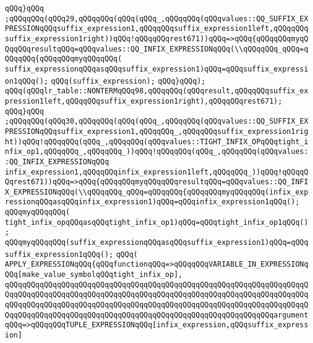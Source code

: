 \verb|qQQq}qQQq|\newline
\verb|;qQQqqQQq(qQQq29,qQQqqQQq(qQQq(qQQq_,qQQqqQQq(qQQqvalues::QQ_SUFFIX_EXPRESSIONqQQqsuffix_expression1,qQQqqQQqsuffix_expression1left,qQQqqQQqsuffix_expression1right))qQQq!qQQqqQQqrest671))qQQq=>qQQq{qQQqqQQqmyqQQqqQQqresultqQQq=qQQqvalues::QQ_INFIX_EXPRESSIONqQQq(\\qQQqqQQq_qQQq=qQQqqQQq{qQQqqQQqmyqQQqqQQq(|\newline
\verb|suffix_expressionqQQqasqQQqsuffix_expression1)qQQq=qQQqsuffix_expression1qQQq();|\newline
\verb|qQQq(suffix_expression);|\newline
\verb|qQQq}qQQq);|\newline
\verb|qQQq(qQQqlr_table::NONTERMqQQq98,qQQqqQQq(qQQqresult,qQQqqQQqsuffix_expression1left,qQQqqQQqsuffix_expression1right),qQQqqQQqrest671);|\newline
\verb|qQQq}qQQq|\newline
\verb|;qQQqqQQq(qQQq30,qQQqqQQq(qQQq(qQQq_,qQQqqQQq(qQQqvalues::QQ_SUFFIX_EXPRESSIONqQQqsuffix_expression1,qQQqqQQq_,qQQqqQQqsuffix_expression1right))qQQq!qQQqqQQq(qQQq_,qQQqqQQq(qQQqvalues::TIGHT_INFIX_OPqQQqtight_infix_op1,qQQqqQQq_,qQQqqQQq_))qQQq!qQQqqQQq(qQQq_,qQQqqQQq(qQQqvalues::QQ_INFIX_EXPRESSIONqQQq|\newline
\verb|infix_expression1,qQQqqQQqinfix_expression1left,qQQqqQQq_))qQQq!qQQqqQQqrest671))qQQq=>qQQq{qQQqqQQqmyqQQqqQQqresultqQQq=qQQqvalues::QQ_INFIX_EXPRESSIONqQQq(\\qQQqqQQq_qQQq=qQQqqQQq{qQQqqQQqmyqQQqqQQq(infix_expressionqQQqasqQQqinfix_expression1)qQQq=qQQqinfix_expression1qQQq();|\newline
\verb|qQQqmyqQQqqQQq(|\newline
\verb|tight_infix_opqQQqasqQQqtight_infix_op1)qQQq=qQQqtight_infix_op1qQQq();|\newline
\verb|qQQqmyqQQqqQQq(suffix_expressionqQQqasqQQqsuffix_expression1)qQQq=qQQqsuffix_expression1qQQq();|\newline
\verb|qQQq(|\newline
\verb|APPLY_EXPRESSIONqQQq{qQQqfunctionqQQq=>qQQqqQQqVARIABLE_IN_EXPRESSIONqQQq[make_value_symbolqQQqtight_infix_op],|\newline
\verb|qQQqqQQqqQQqqQQqqQQqqQQqqQQqqQQqqQQqqQQqqQQqqQQqqQQqqQQqqQQqqQQqqQQqqQQqqQQqqQQqqQQqqQQqqQQqqQQqqQQqqQQqqQQqqQQqqQQqqQQqqQQqqQQqqQQqqQQqqQQqqQQqqQQqqQQqqQQqqQQqqQQqqQQqqQQqqQQqqQQqqQQqqQQqqQQqqQQqqQQqqQQqqQQqqQQqqQQqqQQqqQQqqQQqqQQqqQQqqQQqqQQqqQQqqQQqqQQqqQQqqQQqqQQqqQQqargumentqQQq=>qQQqqQQqTUPLE_EXPRESSIONqQQq[infix_expression,qQQqsuffix_expression]|\newline
